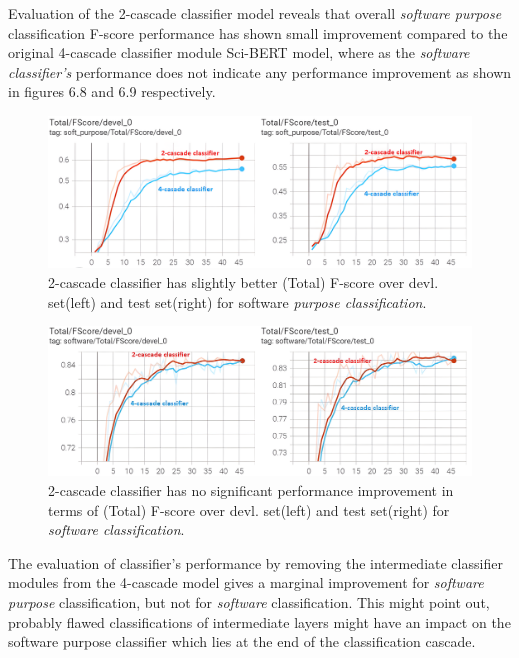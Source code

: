 Evaluation of the 2-cascade classifier model reveals that overall \emph{software purpose} classification F-score performance has shown small improvement compared to the original 4-cascade classifier module  \ac{Sci-BERT} model, where as the \emph{software classifier’s} performance does not indicate any performance improvement as shown in figures 6.8 and 6.9 respectively.  \\

\begin{figure}[htbp]
	\centering
	\includegraphics[width=1\textwidth]{4.graphics/figures/ch_6/5.2layerClassifier/HD/4casadeVs2cascade}
	\caption{2-cascade classifier has slightly better (Total) F-score over devl. set(left) and test set(right) for software \emph{purpose classification}.}
	\label{fig:chapter06:with}
\end{figure}


\begin{figure}[htbp]
	\centering
	\includegraphics[width=1\textwidth]{4.graphics/figures/ch_6/5.2layerClassifier/HD/4casadeVs2cascade_software}
	\caption{2-cascade classifier has no significant performance improvement in terms of (Total) F-score over devl. set(left) and test set(right) for \emph{software classification}.}
	\label{fig:chapter06:with}
\end{figure}

The evaluation of classifier’s performance by removing the intermediate classifier modules from the 4-cascade model gives a marginal improvement for \emph{software purpose} classification, but not for \emph{software} classification. This might point out, probably flawed classifications of intermediate layers might have an impact on the software purpose classifier which lies at the end of the classification cascade. \\

